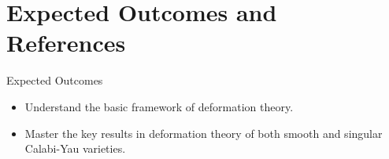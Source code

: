 \documentclass{beamer}
\theoremstyle{definition}
\theoremstyle{plain}
\begin{document}

\section{Expected Outcomes and References}

\begin{frame}{Expected Outcomes}
    \begin{itemize}
        \item Understand the basic framework of deformation theory.
        \pause
        \item Master the key results in deformation theory of both smooth and singular Calabi-Yau varieties.
    \end{itemize}
\end{frame}
\end{document}
